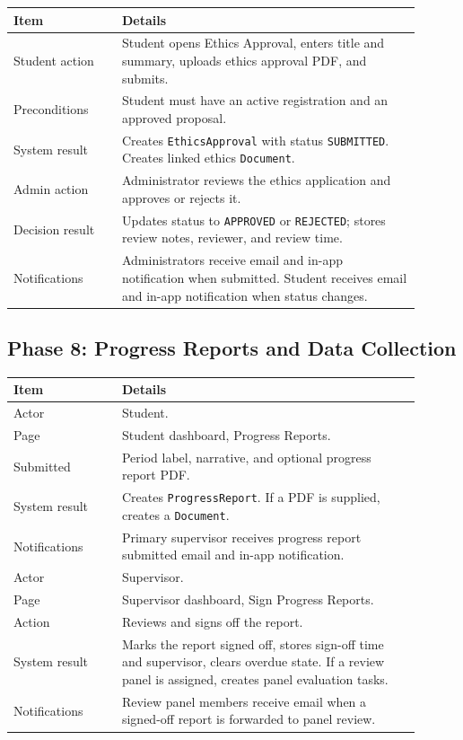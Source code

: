 \documentclass[11pt,a4paper]{article}
\newcommand{\status}[1]{\texttt{#1}}
\newcommand{\code}[1]{\texttt{#1}}
\begin{document}
\begin{longtable}{p{0.24\linewidth} p{0.66\linewidth}}
\toprule
\textbf{Item} & \textbf{Details} \\
\midrule
Student action & Student opens Ethics Approval, enters title and summary, uploads ethics approval PDF, and submits. \\
Preconditions & Student must have an active registration and an approved proposal. \\
System result & Creates \code{EthicsApproval} with status \status{SUBMITTED}. Creates linked ethics \code{Document}. \\
Admin action & Administrator reviews the ethics application and approves or rejects it. \\
Decision result & Updates status to \status{APPROVED} or \status{REJECTED}; stores review notes, reviewer, and review time. \\
Notifications & Administrators receive email and in-app notification when submitted. Student receives email and in-app notification when status changes. \\
\bottomrule
\end{longtable}

\subsection{Phase 8: Progress Reports and Data Collection}

\begin{longtable}{p{0.24\linewidth} p{0.66\linewidth}}
\toprule
\textbf{Item} & \textbf{Details} \\
\midrule
Actor & Student. \\
Page & Student dashboard, Progress Reports. \\
Submitted & Period label, narrative, and optional progress report PDF. \\
System result & Creates \code{ProgressReport}. If a PDF is supplied, creates a \code{Document}. \\
Notifications & Primary supervisor receives progress report submitted email and in-app notification. \\
\midrule
Actor & Supervisor. \\
Page & Supervisor dashboard, Sign Progress Reports. \\
Action & Reviews and signs off the report. \\
System result & Marks the report signed off, stores sign-off time and supervisor, clears overdue state. If a review panel is assigned, creates panel evaluation tasks. \\
Notifications & Review panel members receive email when a signed-off report is forwarded to panel review. \\
\bottomrule
\end{longtable}
\end{document}
